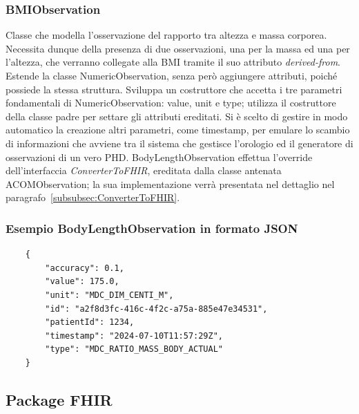 \documentclass[a4paper]{article}
\begin{document}
\subsubsection*{BMIObservation}
Classe che modella l'osservazione del rapporto tra altezza e massa corporea.
Necessita dunque della presenza di due osservazioni, una per la massa ed una per l'altezza, che verranno collegate alla BMI tramite il suo attributo \textit{derived-from}.
Estende la classe NumericObservation, senza però aggiungere attributi, poiché possiede la stessa struttura.
Sviluppa un costruttore che accetta i tre parametri fondamentali di NumericObservation: value, unit e type; utilizza il costruttore della classe padre per settare gli attributi ereditati.
Si è scelto di gestire in modo automatico la creazione altri parametri, come timestamp, per emulare lo scambio di informazioni che avviene tra il sistema che gestisce l'orologio ed il generatore di osservazioni di un vero PHD.
BodyLengthObservation effettua l'override dell'interfaccia \textit{ConverterToFHIR}, ereditata dalla classe antenata ACOMObservation; la sua implementazione verrà presentata nel dettaglio nel paragrafo~\ref{subsubsec:ConverterToFHIR}.
\subsubsection*{Esempio BodyLengthObservation in formato JSON}
\begin{lstlisting}
    {
        "accuracy": 0.1,
        "value": 175.0,
        "unit": "MDC_DIM_CENTI_M",
        "id": "a2f8d3fc-416c-4f2c-a75a-885e47e34531",
        "patientId": 1234,
        "timestamp": "2024-07-10T11:57:29Z",
        "type": "MDC_RATIO_MASS_BODY_ACTUAL"
    }
\end{lstlisting}
\subsection{Package FHIR}
\end{document}

